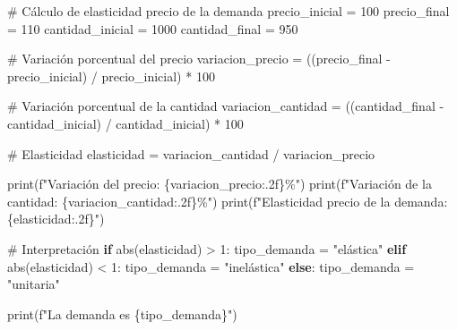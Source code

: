 \documentclass[
  doc,
  floatsintext,
  longtable,
  a4paper,
  nolmodern,
  notxfonts,
  notimes,
  12pt,
  colorlinks=true,linkcolor=blue,citecolor=blue,urlcolor=blue]{apa7}
\newenvironment{Shaded}{\begin{snugshade}}{\end{snugshade}}
\newcommand{\BuiltInTok}[1]{\textcolor[rgb]{0.00,0.23,0.31}{#1}}
\newcommand{\CommentTok}[1]{\textcolor[rgb]{0.37,0.37,0.37}{#1}}
\newcommand{\ControlFlowTok}[1]{\textcolor[rgb]{0.00,0.23,0.31}{\textbf{#1}}}
\newcommand{\DecValTok}[1]{\textcolor[rgb]{0.68,0.00,0.00}{#1}}
\newcommand{\NormalTok}[1]{\textcolor[rgb]{0.00,0.23,0.31}{#1}}
\newcommand{\OperatorTok}[1]{\textcolor[rgb]{0.37,0.37,0.37}{#1}}
\newcommand{\SpecialCharTok}[1]{\textcolor[rgb]{0.37,0.37,0.37}{#1}}
\newcommand{\SpecialStringTok}[1]{\textcolor[rgb]{0.13,0.47,0.30}{#1}}
\newcommand{\StringTok}[1]{\textcolor[rgb]{0.13,0.47,0.30}{#1}}
\begin{document}
\begin{Shaded}
\begin{Highlighting}[]
\CommentTok{\# Cálculo de elasticidad precio de la demanda}
\NormalTok{precio\_inicial }\OperatorTok{=} \DecValTok{100}
\NormalTok{precio\_final }\OperatorTok{=} \DecValTok{110}
\NormalTok{cantidad\_inicial }\OperatorTok{=} \DecValTok{1000}
\NormalTok{cantidad\_final }\OperatorTok{=} \DecValTok{950}

\CommentTok{\# Variación porcentual del precio}
\NormalTok{variacion\_precio }\OperatorTok{=}\NormalTok{ ((precio\_final }\OperatorTok{{-}}\NormalTok{ precio\_inicial) }\OperatorTok{/}\NormalTok{ precio\_inicial) }\OperatorTok{*} \DecValTok{100}

\CommentTok{\# Variación porcentual de la cantidad}
\NormalTok{variacion\_cantidad }\OperatorTok{=}\NormalTok{ ((cantidad\_final }\OperatorTok{{-}}\NormalTok{ cantidad\_inicial) }\OperatorTok{/}\NormalTok{ cantidad\_inicial) }\OperatorTok{*} \DecValTok{100}

\CommentTok{\# Elasticidad}
\NormalTok{elasticidad }\OperatorTok{=}\NormalTok{ variacion\_cantidad }\OperatorTok{/}\NormalTok{ variacion\_precio}

\BuiltInTok{print}\NormalTok{(}\SpecialStringTok{f"Variación del precio: }\SpecialCharTok{\{}\NormalTok{variacion\_precio}\SpecialCharTok{:.2f\}}\SpecialStringTok{\%"}\NormalTok{)}
\BuiltInTok{print}\NormalTok{(}\SpecialStringTok{f"Variación de la cantidad: }\SpecialCharTok{\{}\NormalTok{variacion\_cantidad}\SpecialCharTok{:.2f\}}\SpecialStringTok{\%"}\NormalTok{)}
\BuiltInTok{print}\NormalTok{(}\SpecialStringTok{f"Elasticidad precio de la demanda: }\SpecialCharTok{\{}\NormalTok{elasticidad}\SpecialCharTok{:.2f\}}\SpecialStringTok{"}\NormalTok{)}

\CommentTok{\# Interpretación}
\ControlFlowTok{if} \BuiltInTok{abs}\NormalTok{(elasticidad) }\OperatorTok{\textgreater{}} \DecValTok{1}\NormalTok{:}
\NormalTok{    tipo\_demanda }\OperatorTok{=} \StringTok{"elástica"}
\ControlFlowTok{elif} \BuiltInTok{abs}\NormalTok{(elasticidad) }\OperatorTok{\textless{}} \DecValTok{1}\NormalTok{:}
\NormalTok{    tipo\_demanda }\OperatorTok{=} \StringTok{"inelástica"}
\ControlFlowTok{else}\NormalTok{:}
\NormalTok{    tipo\_demanda }\OperatorTok{=} \StringTok{"unitaria"}

\BuiltInTok{print}\NormalTok{(}\SpecialStringTok{f"La demanda es }\SpecialCharTok{\{}\NormalTok{tipo\_demanda}\SpecialCharTok{\}}\SpecialStringTok{"}\NormalTok{)}
\end{Highlighting}
\end{Shaded}
\end{document}
